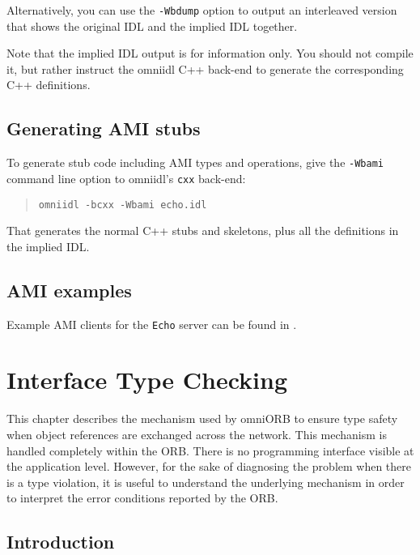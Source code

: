 \documentclass[11pt,twoside,a4paper]{book}
\newcommand{\intf}[1]{\texttt{#1}}
\newcommand{\cmdline}[1]{\texttt{#1}}
\newcommand{\file}{\begingroup \urlstyle{tt}\Url}
\begin{document}
\noindent Alternatively, you can use the \cmdline{-Wbdump} option to
output an interleaved version that shows the original IDL and the
implied IDL together.

Note that the implied IDL output is for information only. You should
not compile it, but rather instruct the omniidl C++ back-end to
generate the corresponding C++ definitions.


\section{Generating AMI stubs}

To generate stub code including AMI types and operations, give the
\cmdline{-Wbami} command line option to omniidl's \cmdline{cxx}
back-end:

\begin{quote}
\cmdline{omniidl -bcxx -Wbami echo.idl}
\end{quote}

\noindent That generates the normal C++ stubs and skeletons, plus all
the definitions in the implied IDL.


\section{AMI examples}

Example AMI clients for the \intf{Echo} server can be found in
\file{src/examples/ami}.



\chapter{Interface Type Checking}
\label{ch_intf}

This chapter describes the mechanism used by omniORB to ensure type
safety when object references are exchanged across the network. This
mechanism is handled completely within the ORB. There is no
programming interface visible at the application level. However, for
the sake of diagnosing the problem when there is a type violation, it
is useful to understand the underlying mechanism in order to interpret
the error conditions reported by the ORB.

\section{Introduction}
\end{document}
